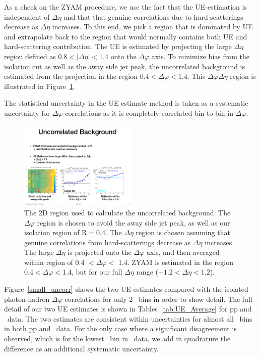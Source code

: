 As a check on the ZYAM procedure, we use the fact that the UE-estimation is independent of $\Delta\eta$ and that that genuine correlations due to hard-scatterings decrease as $\Delta\eta$ increases. To this end, we pick a region that is dominated by UE and extrapolate back to the region that would normally contains both UE and hard-scattering contribution. The UE is estimated by projecting the large $\Delta\eta$ region defined as $0.8 < |\Delta\eta| < 1.4$ onto the $\Delta\varphi$ axis. To minimize bias from the isolation cut as well as the away side jet peak, the uncorrelated background is estimated from the projection in the region $0.4 < \Delta\varphi < 1.4$. This $\Delta\varphi\Delta\eta$ region is illustrated in Figure~\ref{fig:LE_Map}. 

The statistical uncertainty in the UE estimate method is taken as a systematic uncertainty for $\Delta\varphi$ correlations as it is completely correlated bin-to-bin in $\Delta\varphi$.

\begin{figure}[h]
\center
\includegraphics[width=0.5\textwidth]{EventMixing/LE_map.pdf}
\caption{The 2D region used to calculate the uncorrelated background. The $\Delta\varphi$ region is chosen to avoid the away side jet peak, as well as our isolation region of R$=$0.4. The $\Delta\eta$ region is chosen assuming that genuine correlations from hard-scatterings decrease as $\Delta\eta$ increases. The large $\Delta\eta$ is projected onto the $\Delta\varphi$ axis, and then averaged within region of 0.4 $<\Delta\varphi<$ 1.4. ZYAM is estimated in the region $ 0.4 < \Delta\varphi < 1.4$, but for our full $\Delta\eta$ range ($-1.2 < \Delta\eta < 1.2$).}
\label{fig:LE_Map}
\end{figure}

Figure~\ref{small_uncorr} shows the two UE estimates compared with the isolated photon-hadron $\Delta\varphi$ 
correlations for only 2 \zt~bins in order to show detail. The full detail of our two UE estimates is shown in Tables~\ref{tab:UE_Average} for pp and \pPb~data. The two estimates are consistent within uncertainties for almost all \zt~bins in both pp and \pPb~data. For the only case where a significant disagreement is observed, which is for the lowest \zt~bin in \pPb~data, we add in quadrature the difference as an additional systematic uncertainty. 

